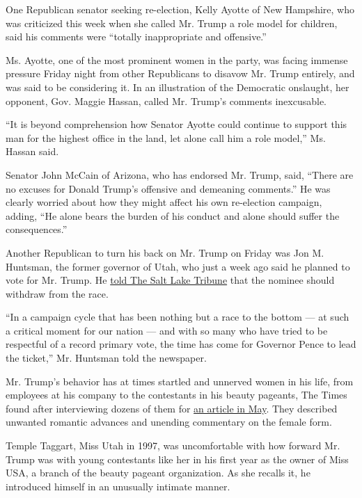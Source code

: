 One Republican senator seeking re-election, Kelly Ayotte of New
Hampshire, who was criticized this week when she called Mr. Trump a role
model for children, said his comments were ``totally inappropriate and
offensive.''

Ms. Ayotte, one of the most prominent women in the party, was facing
immense pressure Friday night from other Republicans to disavow Mr.
Trump entirely, and was said to be considering it. In an illustration of
the Democratic onslaught, her opponent, Gov. Maggie Hassan, called Mr.
Trump's comments inexcusable.

``It is beyond comprehension how Senator Ayotte could continue to
support this man for the highest office in the land, let alone call him
a role model,'' Ms. Hassan said.

Senator John McCain of Arizona, who has endorsed Mr. Trump, said,
``There are no excuses for Donald Trump's offensive and demeaning
comments.'' He was clearly worried about how they might affect his own
re-election campaign, adding, ``He alone bears the burden of his conduct
and alone should suffer the consequences.''

Another Republican to turn his back on Mr. Trump on Friday was Jon M.
Huntsman, the former governor of Utah, who just a week ago said he
planned to vote for Mr. Trump. He
\href{http://www.sltrib.com/news/4444721-155/after-video-huntsman-says-it-is}{told
The Salt Lake Tribune} that the nominee should withdraw from the race.

``In a campaign cycle that has been nothing but a race to the bottom ---
at such a critical moment for our nation --- and with so many who have
tried to be respectful of a record primary vote, the time has come for
Governor Pence to lead the ticket,'' Mr. Huntsman told the newspaper.

Mr. Trump's behavior has at times startled and unnerved women in his
life, from employees at his company to the contestants in his beauty
pageants, The Times found after interviewing dozens of them for
\href{http://www.nytimes3xbfgragh.onion/2016/05/15/us/politics/donald-trump-women.html}{an
article in May}. They described unwanted romantic advances and unending
commentary on the female form.

Temple Taggart, Miss Utah in 1997, was uncomfortable with how forward
Mr. Trump was with young contestants like her in his first year as the
owner of Miss USA, a branch of the beauty pageant organization. As she
recalls it, he introduced himself in an unusually intimate manner.

